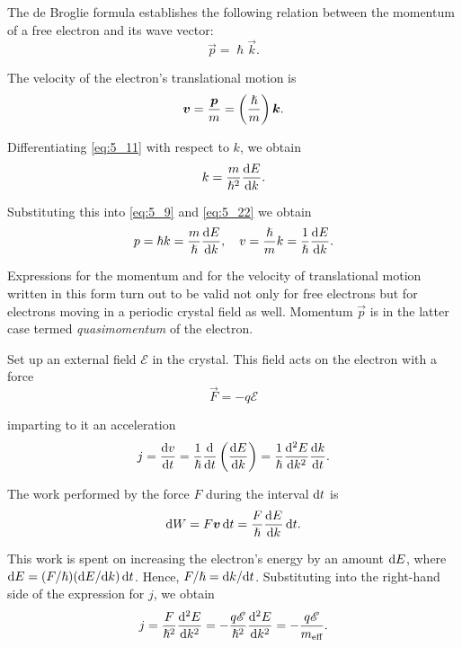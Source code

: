 The de Broglie formula establishes the following relation between the momentum of a free electron and its wave vector:
\begin{equation*}
    \vec{p} = \hslash \vec{k}.
\end{equation*}

\noindent
The velocity of the electron's translational motion is
\begin{equation}\label{eq:5_22}
    \boldsymbol{v} = \frac{\boldsymbol{p}}{m} = \left(\frac{\hslash}{m}\right) \boldsymbol{k}.
\end{equation}

\noindent
Differentiating \eqref{eq:5_11} with respect to $k$, we obtain
\begin{equation*}
    k = \frac{m}{\hslash^2} \dfrac{\mathrm{d} E}{\mathrm{d} k}.
\end{equation*}

\noindent
Substituting this into \eqref{eq:5_9} and \eqref{eq:5_22} we obtain
\begin{equation}\label{eq:5_23}
    p = \hslash k = \frac{m}{\hslash} \dfrac{\mathrm{d} E}{\mathrm{d} k},\quad v = \frac{\hslash}{m} k = \frac{1}{\hslash} \dfrac{\mathrm{d} E}{\mathrm{d} k}.
\end{equation}

Expressions for the momentum and for the velocity of translational motion written in this form turn out to be valid not only for free electrons but for electrons moving in a periodic crystal field as well. Momentum $\vec{p}$ is in the latter case termed \textit{quasimomentum} of the electron.

Set up an external field $\pmb{\mathscr{E}}$ in the crystal. This field acts on the electron with a force
\begin{equation*}
    \vec{F} = - q \pmb{\mathscr{E}}
\end{equation*}

\noindent
imparting to it an acceleration
\begin{equation*}
    j = \dfrac{\mathrm{d} v}{\mathrm{d} t} = \frac{1}{\hslash} \dfrac{\mathrm{d}}{\mathrm{d} t}\left(\dfrac{\mathrm{d} E}{\mathrm{d} k}\right) = \frac{1}{\hslash} \dfrac{\mathrm{d}^{2}E}{\mathrm{d} k^{2}} \dfrac{\mathrm{d} k}{\mathrm{d} t}.
\end{equation*}

\noindent
The work performed by the force $F$ during the interval $\mathrm{d} t$ is
\begin{equation*}
    \mathrm{d} W = F \boldsymbol{v}\, \mathrm{d} t = \frac{F}{\hslash} \dfrac{\mathrm{d} E}{\mathrm{d} k}\, \mathrm{d} t.
\end{equation*}

\noindent
This work is spent on increasing the electron's energy by an amount $\mathrm{d} E$, where $\mathrm{d} E=(F/\hslash) (\mathrm{d} E/\mathrm{d} k)\,\mathrm{d} t$. Hence, $F/\hslash= \mathrm{d} k/\mathrm{d} t$. Substituting into the right-hand side of the expression for $j$, we obtain
\begin{equation}\label{eq:5_24}
    j = \frac{F}{\hslash^2} \dfrac{\mathrm{d}^{2}E}{\mathrm{d} k^{2}} = -\frac{q\mathscr{E}}{\hslash^2} \dfrac{\mathrm{d}^{2}E}{\mathrm{d} k^{2}} = -\frac{q\mathscr{E}}{m_{\text{eff}}}.
\end{equation}


